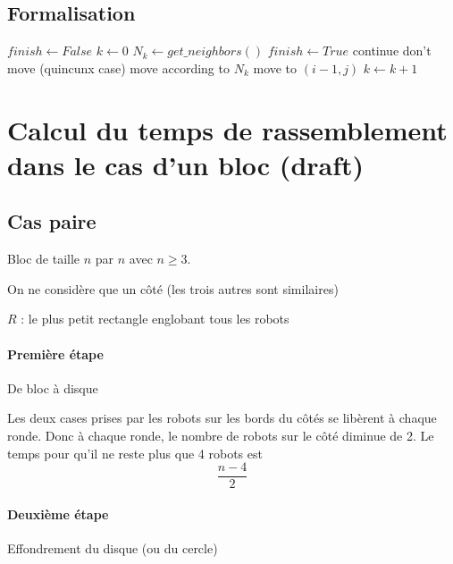\documentclass[11pt, a4paper]{article}
\begin{document}
\subsection{Formalisation}
\begin{algorithm}[H]
  $finish \leftarrow False$\;
  $k \leftarrow 0$\;
   {
    $N_k \leftarrow get\_neighbors()$\;
     {
       {
          $finish \leftarrow True$\;
          continue\;
      }
       {
        don't move (quincunx case)\;
      } {
        move according to $N_k$\;
      }
    } {
       {
          move to $(i-1,j)$\;
      }
    }
    $k \leftarrow k+1$\;
  }
  \caption{}
\end{algorithm}

\section{Calcul du temps de rassemblement dans le cas d'un bloc (draft)}

\subsection{Cas paire}

Bloc de taille $n$ par $n$ avec $n \geq 3$.

On ne considère que un côté (les trois autres sont similaires)

$R$ : le plus petit rectangle englobant tous les robots

\paragraph{Première étape} De bloc à disque

Les deux cases prises par les robots sur les bords du côtés se libèrent à
chaque ronde. Donc à chaque ronde, le nombre de robots sur le côté diminue de
2. Le temps pour qu'il ne reste plus que 4 robots est
\[ \frac{n-4}{2} \]

\paragraph{Deuxième étape} Effondrement du disque (ou du cercle)
\end{document}
